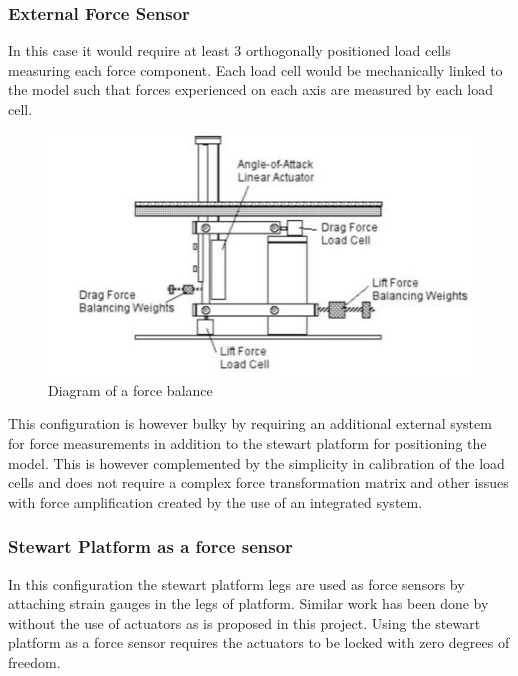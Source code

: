 \subsubsection{External Force Sensor}
In this case it would require at least 3 orthogonally positioned load cells measuring each force component. Each load cell would be mechanically linked to the model such that forces experienced on each axis are measured by each load cell. 
\begin{center}
	\begin{figure}[!h]
		\centering
		\includegraphics{Figures/modBal}
		\caption[Diagram of a force balance]{Diagram of a force balance \cite{post_force_2010}}
	\end{figure}
\end{center}
This configuration is however bulky by requiring an additional external system for force measurements in addition to the stewart platform for positioning the model. This is however complemented by the simplicity in calibration of the load cells and does not require a complex force transformation matrix and other issues with force amplification created by the use of an integrated system.
\subsubsection{Stewart Platform as a force sensor}
In this configuration the stewart platform legs are used as force sensors by attaching strain gauges in the legs of platform. Similar work has been done by \cite{ferreira2015design} without the use of actuators as is proposed in this project. Using the stewart platform as a force sensor requires the actuators to be locked with zero degrees of freedom.

